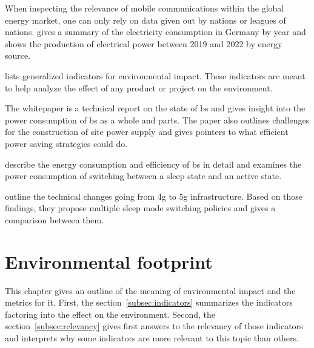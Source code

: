 \documentclass[11pt,a4paper]{article}
\begin{document}
When inspecting the relevance of mobile communications within the global energy market, one can only rely on data given out by nations or leagues of nations.
\citep{Stromverbrauch} gives a summary of the electricity consumption in Germany by year and \citep{Bruttostromerzeugung} shows the production of electrical power between 2019 and 2022 by energy source.

\citep{Umweltindikatoren} lists generalized indicators for environmental impact.
These indicators are meant to help analyze the effect of any product or project on the environment.

The whitepaper \citep{powerwhitepaper} is a technical report on the state of \acrfull{bs} and gives insight into the power consumption of \acrshort{bs} as a whole and parts.
The paper also outlines challenges for the construction of site power supply and gives pointers to what efficient power saving strategies could do.

\citep{5GEfficiencyOverview} describe the energy consumption and efficiency of \acrshort{bs} in detail and examines the power consumption of switching between a sleep state and an active state.

\citep{DynamicSleepModeControl} outline the technical changes going from \acrshort{4g} to \acrfull{5g} infrastructure.
Based on those findings, they propose multiple sleep mode switching policies and gives a comparison between them.

\section{Environmental footprint}\label{sec:energyfootprint}
This chapter gives an outline of the meaning of environmental impact and the metrics for it.
First, the section~\ref{subsec:indicators} summarizes the indicators factoring into the effect on the environment.
Second, the section~\ref{subsec:relevancy} gives first answers to the relevancy of those indicators and interprets why some indicators are more relevant to this topic than others.
\end{document}
